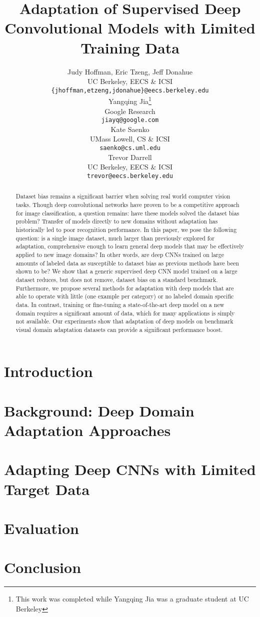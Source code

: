 \documentclass{article} %
\title{Adaptation of Supervised Deep Convolutional Models with Limited Training Data}
\author{
Judy Hoffman, Eric Tzeng, Jeff Donahue \\
UC Berkeley, EECS \& ICSI\\
\footnotesize{\texttt{\{jhoffman,etzeng,jdonahue\}@eecs.berkeley.edu} }\\
\And
Yangqing Jia\thanks{This work was completed while Yangqing Jia was a graduate student at UC Berkeley} \\
Google Research \\
\texttt{jiayq@google.com} \\
\AND
Kate Saenko \\
UMass Lowell, CS \& ICSI \\
\footnotesize{\texttt{saenko@cs.uml.edu}} \\
\And
Trevor Darrell \\
UC Berkeley, EECS \& ICSI\\
\footnotesize{\texttt{trevor@eecs.berkeley.edu}} \\
}
\begin{document}
\maketitle

\begin{abstract}
Dataset bias remains a significant barrier when solving real world computer vision tasks.
Though deep convolutional networks have proven to be a competitive approach for image classification, a question remains: have these models solved the dataset bias problem?
Transfer of models directly to new domains without adaptation has historically led to poor recognition performance.
In this paper, we pose the following question: is a single image dataset, much larger than previously explored for adaptation, comprehensive enough to learn general deep models that may be effectively applied to new image domains? In other words, are deep CNNs trained on large amounts of labeled data as susceptible to dataset bias as previous methods have been shown to be?
We show that a generic supervised deep CNN model trained on a large dataset reduces, but does not remove, dataset bias on a standard benchmark.
Furthermore, we propose several methods for adaptation with deep models that are able to operate with little (one example per category) or no labeled domain specific data. In contrast, training or fine-tuning a state-of-the-art deep model on a new domain requires a significant amount of data, which for many applications is simply not available.
Our experiments show that adaptation of deep models on benchmark visual domain adaptation datasets can provide a significant performance boost.

\end{abstract}

\section{Introduction}


\vspace{-.3cm}
\section{Background: Deep Domain Adaptation Approaches}
\vspace{-.2cm}


\vspace{-.3cm}
\section{Adapting Deep CNNs with Limited Target Data}
\label{sec:adapt-algs}
\vspace{-.2cm}


\section{Evaluation}


\section{Conclusion}



\small{


}
\end{document}
